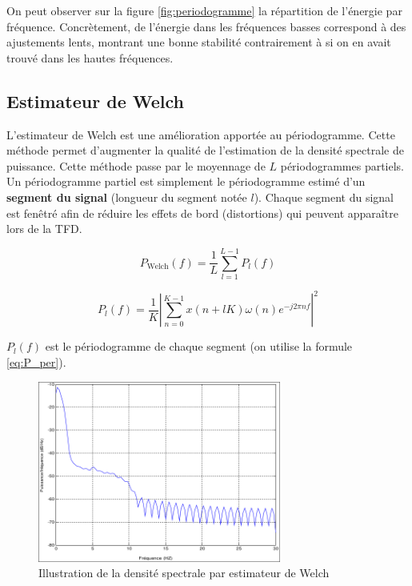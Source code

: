On peut observer sur la figure \ref{fig:periodogramme} la répartition de l'énergie par fréquence.
Concrètement, de l'énergie dans les fréquences basses correspond à des ajustements lents, montrant une bonne stabilité contrairement à si on en avait trouvé dans les hautes fréquences.

\subsection{Estimateur de Welch}

L'estimateur de Welch est une amélioration apportée au périodogramme.
Cette méthode permet d'augmenter la qualité de l'estimation de la densité spectrale de puissance.
Cette méthode passe par le moyennage de $L$ périodogrammes partiels.
Un périodogramme partiel est simplement le périodogramme estimé d'un \textbf{segment du signal} (longueur du segment notée $l$).
Chaque segment du signal est fenêtré afin de réduire les effets de bord (distortions) qui peuvent apparaître lors de la TFD.

\begin{equation}
  P_{\text{Welch}}(f)=\frac{1}{L}\sum\limits_{l=1}^{L-1}P_l(f)
  \label{eq:P_Welch}
\end{equation}

\begin{equation} 
  P_l(f) = \frac{1}{K}\left|\sum\limits_{n=0}^{K-1}x(n+lK)\omega(n)e^{-j2\pi nf}\right|^2
  \label{eq:P_l}
\end{equation}

$P_l(f)$ est le périodogramme de chaque segment (on utilise la formule \ref{eq:P_per}).

\begin{figure}[ht]
  \centering
  \includegraphics[width=8cm]{images/methode/welch.png}
  \caption{Illustration de la densité spectrale par estimateur de Welch}
  \label{fig:welch}
\end{figure}

